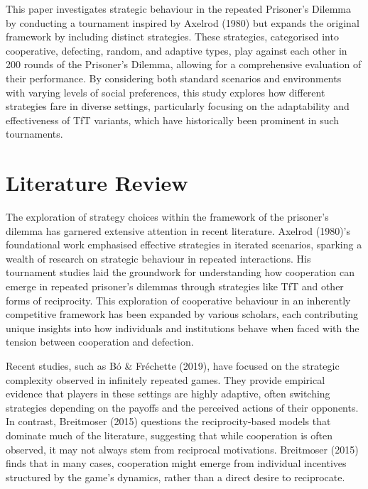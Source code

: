 \documentclass[11pt,preprint]{elsarticle}
\numberwithin{equation}{section}
\numberwithin{figure}{section}
\numberwithin{table}{section}
\begin{document}
This paper investigates strategic behaviour in the repeated Prisoner's
Dilemma by conducting a tournament inspired by Axelrod (1980) but
expands the original framework by including distinct strategies. These
strategies, categorised into cooperative, defecting, random, and
adaptive types, play against each other in 200 rounds of the Prisoner's
Dilemma, allowing for a comprehensive evaluation of their performance.
By considering both standard scenarios and environments with varying
levels of social preferences, this study explores how different
strategies fare in diverse settings, particularly focusing on the
adaptability and effectiveness of TfT variants, which have historically
been prominent in such tournaments.

\section{\texorpdfstring{Literature
Review\label{litreview}}{Literature Review}}\label{literature-review}

The exploration of strategy choices within the framework of the
prisoner's dilemma has garnered extensive attention in recent
literature. Axelrod (1980)'s foundational work emphasised effective
strategies in iterated scenarios, sparking a wealth of research on
strategic behaviour in repeated interactions. His tournament studies
laid the groundwork for understanding how cooperation can emerge in
repeated prisoner's dilemmas through strategies like TfT and other forms
of reciprocity. This exploration of cooperative behaviour in an
inherently competitive framework has been expanded by various scholars,
each contributing unique insights into how individuals and institutions
behave when faced with the tension between cooperation and defection.

Recent studies, such as Bó \& Fréchette (2019), have focused on the
strategic complexity observed in infinitely repeated games. They provide
empirical evidence that players in these settings are highly adaptive,
often switching strategies depending on the payoffs and the perceived
actions of their opponents. In contrast, Breitmoser (2015) questions the
reciprocity-based models that dominate much of the literature,
suggesting that while cooperation is often observed, it may not always
stem from reciprocal motivations. Breitmoser (2015) finds that in many
cases, cooperation might emerge from individual incentives structured by
the game's dynamics, rather than a direct desire to reciprocate.
\end{document}
